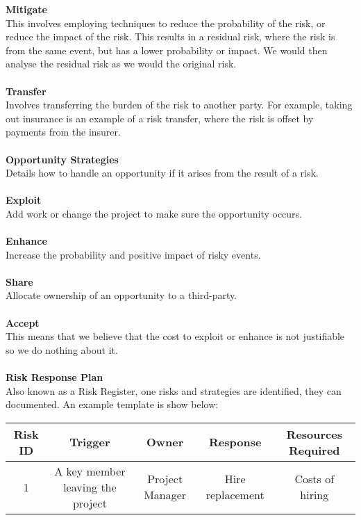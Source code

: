 \documentclass[a4paper,10pt]{article}
\begin{document}
\textbf{Mitigate} \\
This involves employing techniques to reduce the probability of the risk, or reduce the impact of the risk. This results in a residual risk, where the risk is from the same event, but has a lower probability or impact. We would then analyse the residual risk as we would the original risk. \\\\
\textbf{Transfer} \\
Involves transferring the burden of the risk to another party. For example, taking out insurance is an example of a risk transfer, where the risk is offset by payments from the insurer. \\\\
\textcolor{BlueGreen}{\textbf{Opportunity Strategies}} \\
Details how to handle an opportunity if it arises from the result of a risk. \\\\
\textbf{Exploit} \\
Add work or change the project to make sure the opportunity occurs. \\\\
\textbf{Enhance} \\
Increase the probability and positive impact of risky events. \\\\
\textbf{Share} \\
Allocate ownership of an opportunity to a third-party. \\\\
\textbf{Accept} \\
This means that we believe that the cost to exploit or enhance is not justifiable so we do nothing about it. \\\\
\textcolor{BlueGreen}{\textbf{Risk Response Plan}} \\
Also known as a Risk Register, one risks and strategies are identified, they can documented. An example template is show below:
\begin{center}
	\begin{tabular}{|c|c|c|c|c|}
		\hline 
		\textbf{Risk ID} &\textbf{Trigger} &\textbf{Owner} &\textbf{Response} &\textbf{Resources Required} \\
		\hline
		1 &A key member leaving the project &Project Manager &Hire replacement &Costs of hiring \\
		\hline
	\end{tabular}
\end{center}
\end{document}
